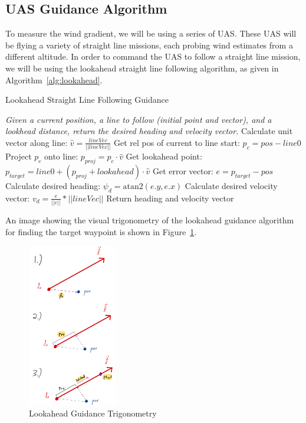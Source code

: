 \subsection{UAS Guidance Algorithm}

To measure the wind gradient, we will be using a series of UAS. These UAS will be flying a variety of straight line missions, each probing wind estimates from a different altitude. 
In order to command the UAS to follow a straight line mission, we will be using the lookahead straight line following algorithm, as given in Algorithm~\ref{alg:lookahead}.

\begin{algorithm}
    \caption{Lookahead Straight Line Following Guidance}\label{alg:lookahead}
    \begin{algorithmic}
    \State \textit{Given a current position, a line to follow (initial point and vector), and a lookhead distance, return the desired heading and velocity vector.}
    \State Calculate unit vector along line: $\hat{v} = \frac{lineVec}{||lineVec||}$
    \State Get rel pos of current to line start: $p_c = pos - line0$
    \State Project $p_c$ onto line: $p_{proj} = p_c \cdot \hat{v}$
    \State Get lookahead point: $p_{target} = line0 + (p_{proj} + lookahead) \cdot \hat{v}$
    \State Get error vector: $e = p_{target} - pos$
    \State Calculate desired heading: $\psi_d = \text{atan2}(e.y, e.x)$
    \State Calculate desired velocity vector: $v_d = \frac{e}{||e||} * ||lineVec||$
    \State Return heading and velocity vector
    \EndFunction
    \end{algorithmic}
\end{algorithm}

An image showing the visual trigonometry of the lookahead guidance algorithm for finding the target waypoint is shown in Figure~\ref{fig:lookahead}.

\begin{figure}[h]  
    \centering
    \includegraphics[width=0.35\textwidth]{images/proj_math.jpeg}
    \caption{Lookahead Guidance Trigonometry}
    \label{fig:lookahead}
\end{figure}

